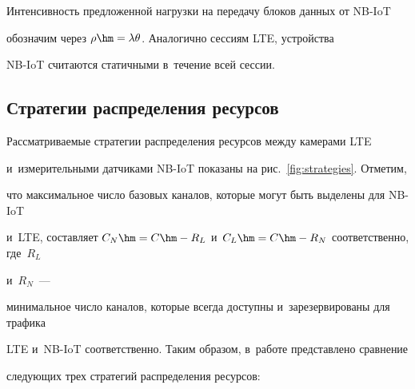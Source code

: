 Интенсивность предложенной нагрузки на передачу блоков данных от NB-IoT 


обозначим через $\rho \hm= \lambda\theta$. Аналогично сессиям LTE, устройства 


NB-IoT считаются статичными в~течение всей сессии.





\subsection{Стратегии распределения ресурсов}








Рассматриваемые стратегии распределения ресурсов между камерами LTE 


и~измерительными датчиками NB-IoT показаны на рис.~\ref{fig:strategies}. Отметим, 


что максимальное число базовых каналов, которые могут быть выделены для NB-IoT 


и~LTE, составляет $C_N\hm=C\hm-R_L$ и~$C_L\hm=C\hm-R_N$ соответственно, где~$R_L$ 


и~$R_N$~--- 


минимальное число каналов, которые всегда доступны и~зарезервированы для трафика 


LTE и~NB-IoT соответственно. Таким образом, в~работе представлено сравнение 


следующих трех стратегий распределения ресурсов:


